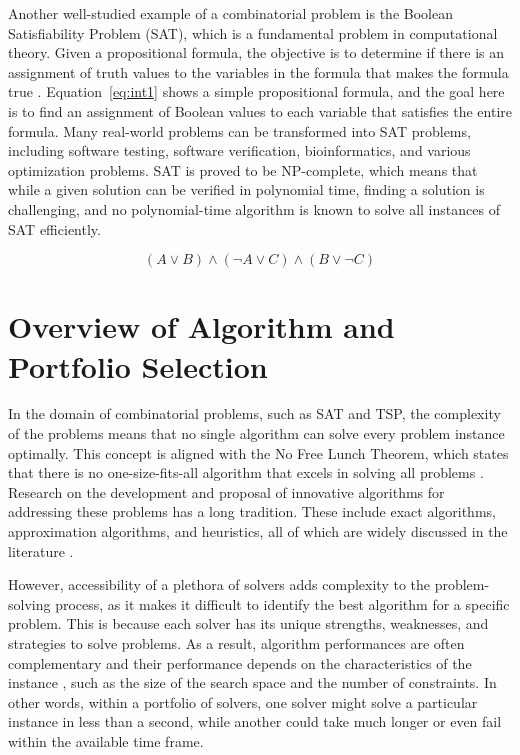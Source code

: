 Another well-studied example of a combinatorial problem is the Boolean Satisfiability Problem (SAT), which is a fundamental problem in computational theory. Given a propositional formula, the objective is to determine if there is an assignment of truth values to the variables in the formula that makes the formula true \cite{HOOS2005257}. Equation~\ref{eq:int1} shows a simple propositional formula, and the goal here is to find an assignment of Boolean values to each variable that satisfies the entire formula. Many real-world problems can be transformed into SAT problems, including software testing, software verification, bioinformatics, and various optimization problems. SAT is proved to be NP-complete, which means that while a given solution can be verified in polynomial time, finding a solution is challenging, and no polynomial-time algorithm is known to solve all instances of SAT efficiently.

\begin{equation}\label{eq:int1}
        (A \vee B) \wedge (\neg A \vee C) \wedge (B \vee \neg C)
\end{equation}

\section{Overview of Algorithm and Portfolio Selection}
In the domain of combinatorial problems, such as SAT and TSP, the complexity of the problems means that no single algorithm can solve every problem instance optimally. This concept is aligned with the No Free Lunch Theorem, which states that there is no one-size-fits-all algorithm that excels in solving all problems \cite{Karp1972}. 
Research on the development and proposal of innovative algorithms for addressing these problems has a long tradition. These include exact algorithms, approximation algorithms, and heuristics, all of which are widely discussed in the literature \cite{series/faia/336}. 

However, accessibility of a plethora of solvers adds complexity to the problem-solving process, as it makes it difficult to identify the best algorithm for a specific problem. This is because each solver has its unique strengths, weaknesses, and strategies to solve problems. As a result, algorithm performances are often complementary and their performance depends on the characteristics of the instance \cite{Kotthoff2014}, such as the size of the search space and the number of constraints. In other words, within a portfolio of solvers, one solver might solve a particular instance in less than a second, while another could take much longer or even fail within the available time frame. 

